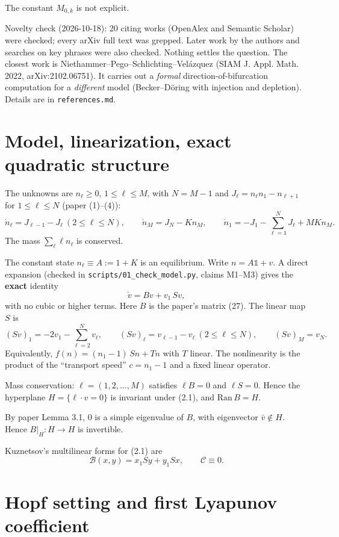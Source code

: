 \documentclass[11pt,a4paper]{report}
\begin{document}
The constant \(M_{0,k}\) is not explicit.

Novelty check (2026-10-18): 20 citing works (OpenAlex and Semantic Scholar) were checked; every arXiv full text was
grepped. Later work by the authors and searches on key phrases were also checked. Nothing settles the question.
The closest work is Niethammer--Pego--Schlichting--Velázquez (SIAM J. Appl. Math. 2022, arXiv:2102.06751). It
carries out a \emph{formal} direction-of-bifurcation computation for a \emph{different} model (Becker--Döring with injection
and depletion). Details are in \texttt{references.md}.

\section{Model, linearization, exact quadratic structure}

The unknowns are \(n_\ell\ge0\), \(1\le\ell\le M\), with \(N=M-1\) and \(J_\ell=n_\ell n_1-n_{\ell+1}\) for
\(1\le\ell\le N\) (paper (1)--(4)):
\[\dot n_\ell=J_{\ell-1}-J_\ell\ (2\le\ell\le N),\qquad \dot n_M=J_N-Kn_M,\qquad
\dot n_1=-J_1-\sum_{\ell=1}^N J_\ell+MKn_M .\]
The mass \(\sum_\ell \ell n_\ell\) is conserved.

The constant state \(n_\ell\equiv A:=1+K\) is an equilibrium. Write \(n=A\mathbb 1+v\). A direct expansion
(checked in \texttt{scripts/01\_check\_model.py}, claims M1--M3) gives the \textbf{exact} identity
\[\dot v = Bv + v_1\,Sv ,\tag{2.1}\]
with no cubic or higher terms. Here \(B\) is the paper's matrix (27). The linear map \(S\) is
\[(Sv)_1=-2v_1-\sum_{\ell=2}^{N}v_\ell,\qquad (Sv)_\ell=v_{\ell-1}-v_\ell\ (2\le\ell\le N),\qquad (Sv)_M=v_N .\]
Equivalently, \(f(n)=(n_1-1)\,Sn+Tn\) with \(T\) linear. The nonlinearity is the product of the ``transport speed''
\(c=n_1-1\) and a fixed linear operator.

Mass conservation: \(\boldsymbol\ell=(1,2,\dots,M)\) satisfies \(\boldsymbol\ell B=0\) and \(\boldsymbol\ell S=0\).
Hence the hyperplane \(H=\{\boldsymbol\ell\cdot v=0\}\) is invariant under (2.1), and \(\mathrm{Ran}\,B=H\).

By paper Lemma 3.1, \(0\) is a simple eigenvalue of \(B\), with eigenvector \(\bar v\notin H\). Hence \(B|_H:H\to H\)
is invertible.

Kuznetsov's multilinear forms for (2.1) are
\[\mathcal B(x,y)=x_1Sy+y_1Sx,\qquad \mathcal C\equiv0 .\]

\section{Hopf setting and first Lyapunov coefficient}
\end{document}
